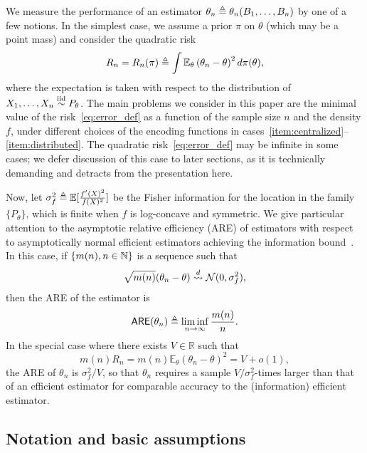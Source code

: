 We measure the performance of an estimator $\theta_n \triangleq
\theta_n(B_1,\ldots,B_n)$ by one of a few notions. In the simplest case,
we assume a prior $\pi$ on $\theta$ (which may be a point
mass) and consider the quadratic risk
\begin{equation}
  \label{eq:error_def}
  R_n = R_n(\pi) \triangleq \int \mathbb{E}_\theta\left({\theta}_n - \theta \right)^2
  d\pi(\theta),
\end{equation}
where the expectation is taken with respect to the distribution of
$X_1,\ldots,X_n \stackrel{\textup{iid}}{\sim} P_\theta$.  The main problems we consider in this
paper are the minimal value of the risk~\eqref{eq:error_def} as a function
of the sample size $n$ and the density $f$, under different choices of the
encoding functions in
cases~\eqref{item:centralized}--\eqref{item:distributed}.
The quadratic risk~\eqref{eq:error_def} may be infinite in some cases;
we defer discussion of this case to later sections, as it is technically
demanding and detracts from the presentation here.

Now, let $\sigma_f^2 \triangleq \mathbb{E}[\frac{f'(X)^2}{f(X)^2}]$ be the Fisher
information for the location in the family $\{P_\theta\}$, which is finite
when $f$ is log-concave and symmetric. We give particular attention to the
asymptotic relative efficiency (ARE) of estimators with respect to
asymptotically normal efficient estimators achieving the information
bound~\cite{VanDerVaart98}. In this case,
if $\{m(n), n \in \mathbb{N}\}$ is a sequence such that
\begin{equation*}
  \sqrt{m(n)} (\theta_n - \theta) \stackrel{d}{\rightsquigarrow} \mathcal{N}(0, \sigma_f^2),
\end{equation*}
then the ARE of the estimator is~\cite[Def.~6.6.6]{LehmannCa98}
\begin{equation}
  \label{eqn:are-def}
  \mathsf{ARE}({\theta}_n) \triangleq
  \liminf_{n\rightarrow \infty} \frac{m(n)}{n}.
\end{equation}
In the special case where there exists $V \in \mathbb R$ such that
\begin{equation*}
  m(n) R_n =
  m(n) \mathbb E_\theta\left({\theta}_n - \theta \right)^2 = V + o(1),
\end{equation*}
the ARE of ${\theta}_n$ is $\sigma_f^2/V$, so that $\theta_n$ requires a
sample $V / \sigma_f^2$-times larger than that of an efficient estimator for
comparable accuracy to the (information) efficient estimator.

\subsection*{Notation and basic assumptions}

